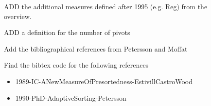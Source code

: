 \begin{figure}
\begin{TODO}
ADD the additional measures defined after 1995 (e.g. Reg) from the overview.
\end{TODO}

\begin{TODO}
ADD a definition for the number of pivots 
\end{TODO}

\begin{TODO}
Add the bibliographical references from Petersson and Moffat
\end{TODO}

\begin{TODO}
Find the bibtex code for the following references
\begin{itemize}
\item 1989-IC-ANewMeasureOfPresortedness-EstivillCastroWood
\item 1990-PhD-AdaptiveSorting-Petersson
\end{itemize}
\end{TODO}


\end{figure}
